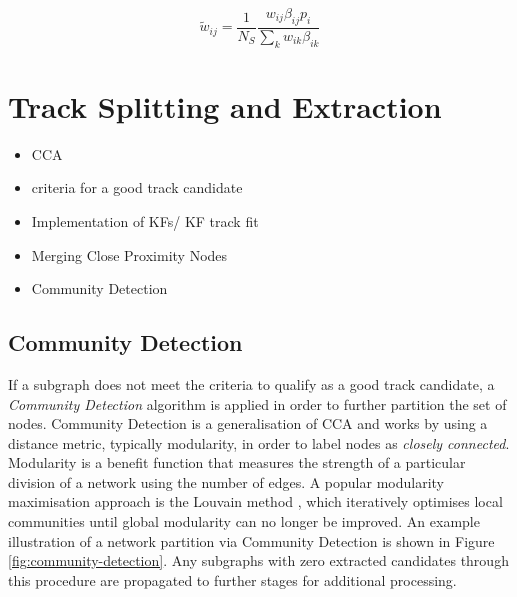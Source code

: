\begin{equation}
\widetilde{w}_{ij} = \frac{1}{N_S} \frac{w_{ij}\beta_{ij} p_i}{\sum_{k}w_{ik}\beta_{ik}}
\label{eqn:weights}
\end{equation}



\section{Track Splitting and Extraction}
\begin{itemize}
    \item CCA
    \item criteria for a good track candidate
    \item Implementation of KFs/ KF track fit
    \item Merging Close Proximity Nodes
    \item Community Detection
\end{itemize}

\subsection{Community Detection}

If a subgraph does not meet the criteria to qualify as a good track candidate, a \textit{Community Detection} algorithm \cite{community} is applied in order to further partition the set of nodes. Community Detection is a generalisation of CCA and works by using a distance metric, typically modularity, in order to label nodes as \textit{closely connected}. Modularity is a benefit function that measures the strength of a particular division of a network using the number of edges. A popular modularity maximisation approach is the Louvain method \cite{python_louvain}, which iteratively optimises local communities until global modularity can no longer be improved. An example illustration of a network partition via Community Detection is shown in Figure \ref{fig:community-detection}. Any subgraphs with zero extracted candidates through this procedure are propagated to further stages for additional processing.



